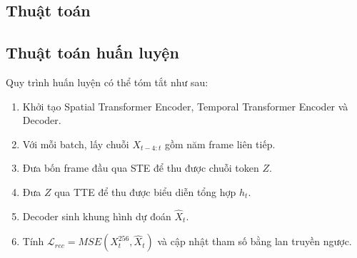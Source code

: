 \subsection{Thuật toán}

\subsection{Thuật toán huấn luyện}

Quy trình huấn luyện có thể tóm tắt như sau:
\begin{enumerate}
    \item Khởi tạo Spatial Transformer Encoder, Temporal Transformer Encoder và Decoder.
    \item Với mỗi batch, lấy chuỗi $X_{t-4:t}$ gồm năm frame liên tiếp.
    \item Đưa bốn frame đầu qua STE để thu được chuỗi token $Z$.
    \item Đưa $Z$ qua TTE để thu được biểu diễn tổng hợp $h_t$.
    \item Decoder sinh khung hình dự đoán $\hat{X}_t$.
    \item Tính $\mathcal{L}_{rec}=MSE(X_t^{256},\hat{X}_t)$ và cập nhật tham số bằng lan truyền ngược.
\end{enumerate}
